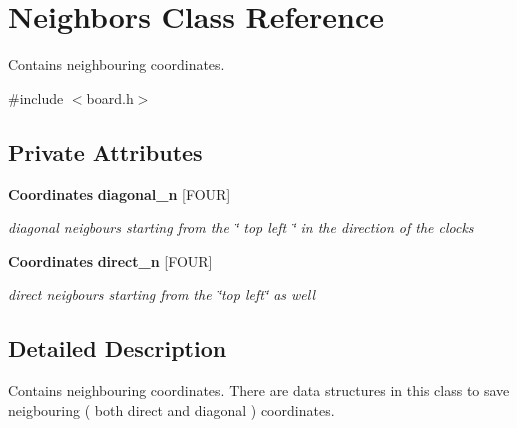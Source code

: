 \section{Neighbors Class Reference}
\label{classNeighbors}


Contains neighbouring coordinates.  




{\ttfamily \#include $<$board.h$>$}

\subsection*{Private Attributes}
\begin{DoxyCompactItemize}
\item 
{\bf Coordinates} {\bf diagonal\_\-n} [FOUR]\label{classNeighbors_a7a7d7b964897a6c20575a3f79d9ae321}

\begin{DoxyCompactList}\small\item\em diagonal neigbours starting from the \char`\"{} top left \char`\"{} in the direction of the clocks \item\end{DoxyCompactList}\item 
{\bf Coordinates} {\bf direct\_\-n} [FOUR]\label{classNeighbors_a243bd728dad7a45f9ebf19e42894e94c}

\begin{DoxyCompactList}\small\item\em direct neigbours starting from the \char`\"{}top left\char`\"{} as well \item\end{DoxyCompactList}\end{DoxyCompactItemize}


\subsection{Detailed Description}
Contains neighbouring coordinates. There are data structures in this class to save neigbouring ( both direct and diagonal ) coordinates. 